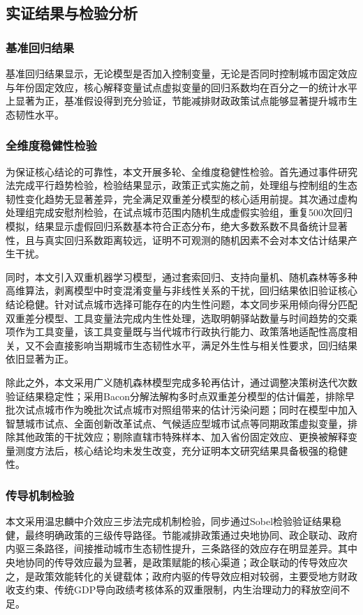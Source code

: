 \documentclass[lang=cn,a4paper,11pt]{elegantpaper}
\begin{document}
\subsection{实证结果与检验分析}
\subsubsection{基准回归结果}
基准回归结果显示，无论模型是否加入控制变量，无论是否同时控制城市固定效应与年份固定效应，核心解释变量试点虚拟变量的回归系数均在百分之一的统计水平上显著为正，基准假设得到充分验证，节能减排财政政策试点能够显著提升城市生态韧性水平。
\subsubsection{全维度稳健性检验}
为保证核心结论的可靠性，本文开展多轮、全维度稳健性检验。首先通过事件研究法完成平行趋势检验，检验结果显示，政策正式实施之前，处理组与控制组的生态韧性变化趋势无显著差异，完全满足双重差分模型的核心适用前提。其次通过虚构处理组完成安慰剂检验，在试点城市范围内随机生成虚假实验组，重复500次回归模拟，结果显示虚假回归系数基本符合正态分布，绝大多数系数不具备统计显著性，且与真实回归系数距离较远，证明不可观测的随机因素不会对本文估计结果产生干扰。

同时，本文引入双重机器学习模型，通过套索回归、支持向量机、随机森林等多种高维算法，剥离模型中时变混淆变量与非线性关系的干扰，回归结果依旧验证核心结论稳健。针对试点城市选择可能存在的内生性问题，本文同步采用倾向得分匹配双重差分模型、工具变量法完成内生性处理，选取明朝驿站数量与时间趋势的交乘项作为工具变量，该工具变量既与当代城市行政执行能力、政策落地适配性高度相关，又不会直接影响当期城市生态韧性水平，满足外生性与相关性要求，回归结果依旧显著为正。

除此之外，本文采用广义随机森林模型完成多轮再估计，通过调整决策树迭代次数验证结果稳定性；采用Bacon分解法解构多时点双重差分模型的估计偏差，排除早批次试点城市作为晚批次试点城市对照组带来的估计污染问题；同时在模型中加入智慧城市试点、全面创新改革试点、气候适应型城市试点等同期政策虚拟变量，排除其他政策的干扰效应；剔除直辖市特殊样本、加入省份固定效应、更换被解释变量测度方法后，核心结论均未发生改变，充分证明本文研究结果具备极强的稳健性。

\subsubsection{传导机制检验}
本文采用温忠麟中介效应三步法完成机制检验，同步通过Sobel检验验证结果稳健，最终明确政策的三级传导路径。节能减排政策通过央地协同、政企联动、政府内驱三条路径，间接推动城市生态韧性提升，三条路径的效应存在明显差异。其中央地协同的传导效应最为显著，是政策赋能的核心渠道；政企联动的传导效应次之，是政策效能转化的关键载体；政府内驱的传导效应相对较弱，主要受地方财政收支约束、传统GDP导向政绩考核体系的双重限制，内生治理动力的释放空间不足。
\end{document}
